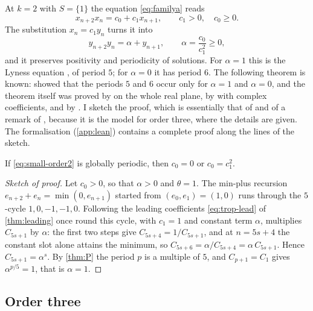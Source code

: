 At $k=2$ with $S=\{1\}$ the equation \eqref{eq:familya} reads
\begin{equation}
x_{n+2}x_n=c_0+c_1x_{n+1},\qquad c_1>0,\quad c_0\ge0.
\label{eq:small-order2}
\end{equation}
The substitution $x_n=c_1y_n$ turns it into
\begin{equation}
y_{n+2}y_n=\alpha+y_{n+1},\qquad \alpha=\frac{c_0}{c_1^2}\ge0,
\label{eq:small-lyness}
\end{equation}
and it preserves positivity and periodicity of solutions. For $\alpha=1$
this is the Lyness equation \citep{Lyness1942}, of period $5$; for
$\alpha=0$ it has period $6$. The following theorem is known:
\citet{KocicLadasRodrigues1993} showed that the periods $5$ and $6$ occur only
for $\alpha=1$ and $\alpha=0$, and the theorem itself was proved by
\citet{BarbeauGelbordTanny1995} on the whole real plane, by
\citet{CsornyeiLaczkovich2001} with complex coefficients, and by
\citet[Theorem~3.1]{CimaGasullManosas2004}. I sketch the proof, which is
essentially that of \citet[Lemma~5]{CsornyeiLaczkovich2001} and of a remark of
\citet[Section~3]{BarbeauGelbordTanny1995}, because it is the model for order
three, where the details are given. The formalisation (\autoref{app:lean})
contains a complete proof along the lines of the sketch.

\begin{theorem}
\label{thm:order2}
If \eqref{eq:small-order2} is globally periodic, then $c_0=0$ or
$c_0=c_1^2$.
\end{theorem}

\begin{proof}[Sketch of proof]
Let $c_0>0$, so that $\alpha>0$ and $\theta=1$. The min-plus recursion
$e_{n+2}+e_n=\min(0,e_{n+1})$ started from $(e_0,e_1)=(1,0)$ runs through
the $5$-cycle $1,0,-1,-1,0$. Following the leading coefficients
\eqref{eq:trop-lead} of \autoref{thm:leading} once round this cycle, with
$c_1=1$ and constant term $\alpha$, multiplies $C_{5s+1}$ by $\alpha$: the first
two steps give $C_{5s+4}=1/C_{5s+1}$, and at $n=5s+4$ the constant slot alone
attains the minimum, so $C_{5s+6}=\alpha/C_{5s+4}=\alpha\,C_{5s+1}$. Hence
$C_{5s+1}=\alpha^s$. By \autoref{thm:P} the period $p$ is a multiple of $5$,
and $C_{p+1}=C_1$ gives $\alpha^{p/5}=1$, that is $\alpha=1$.
\end{proof}

\subsection{Order three}

